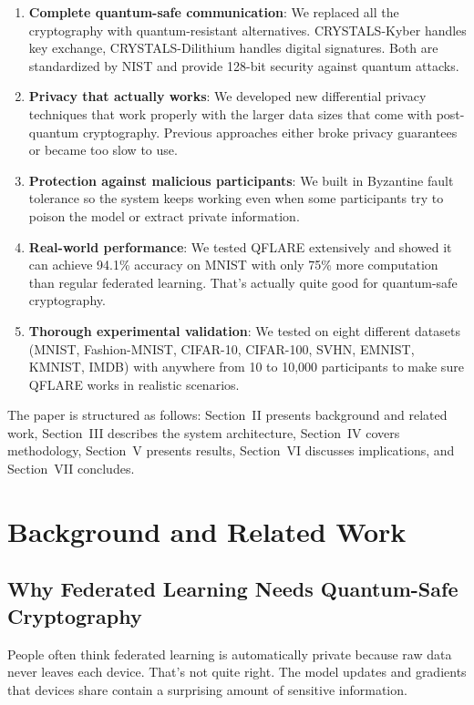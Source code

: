 \documentclass[journal]{IEEEtran}
\begin{document}
\begin{enumerate}
\item \textbf{Complete quantum-safe communication}: We replaced all the cryptography with quantum-resistant alternatives. CRYSTALS-Kyber handles key exchange, CRYSTALS-Dilithium handles digital signatures. Both are standardized by NIST and provide 128-bit security against quantum attacks.

\item \textbf{Privacy that actually works}: We developed new differential privacy techniques that work properly with the larger data sizes that come with post-quantum cryptography. Previous approaches either broke privacy guarantees or became too slow to use.

\item \textbf{Protection against malicious participants}: We built in Byzantine fault tolerance so the system keeps working even when some participants try to poison the model or extract private information.

\item \textbf{Real-world performance}: We tested QFLARE extensively and showed it can achieve 94.1\% accuracy on MNIST with only 75\% more computation than regular federated learning. That's actually quite good for quantum-safe cryptography.

\item \textbf{Thorough experimental validation}: We tested on eight different datasets (MNIST, Fashion-MNIST, CIFAR-10, CIFAR-100, SVHN, EMNIST, KMNIST, IMDB) with anywhere from 10 to 10,000 participants to make sure QFLARE works in realistic scenarios.
\end{enumerate}

The paper is structured as follows: Section~II presents background and related work, Section~III describes the system architecture, Section~IV covers methodology, Section~V presents results, Section~VI discusses implications, and Section~VII concludes.

\section{Background and Related Work}

\subsection{Why Federated Learning Needs Quantum-Safe Cryptography}

People often think federated learning is automatically private because raw data never leaves each device. That's not quite right. The model updates and gradients that devices share contain a surprising amount of sensitive information.
\end{document}

